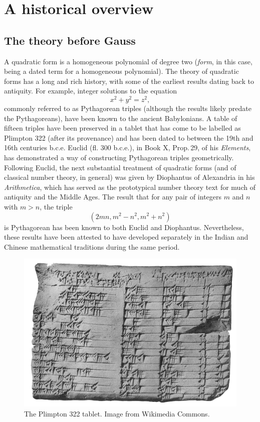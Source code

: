 
\chapter{A historical overview}
\label{chap:history}

\section{The theory before Gauss}

A quadratic form is a homogeneous polynomial of degree two (\emph{form}, in this
case, being a dated term for a homogeneous polynomial). The theory of quadratic
forms has a long and rich history, with some of the earliest results dating back
to antiquity. For example, integer solutions to the equation
\[
    x^2 + y^2 = z^2,
\]
commonly referred to as Pythagorean triples (although the results likely predate
the Pythagoreans), have been known to the ancient Babylonians. A table of
fifteen triples have been preserved in a tablet that has come to be labelled as
Plimpton 322 (after its provenance) and has been dated to between the 19th and
16th centuries {\sc b.c.e.} \cite{robson2002words} Euclid (fl.
300 {\sc b.c.e.}), in Book X, Prop.\,29, of his
\emph{Elements}, has demonstrated a way of constructing Pythagorean triples
geometrically.\,\cite{euclid1956elements} Following Euclid, the next substantial
treatment of quadratic forms (and of classical number theory, in general) was
given by Diophantus of Alexandria in his \emph{Arithmetica}, which has served as
the prototypical number theory text for much of antiquity and the Middle Ages.
\cite{katz2009history} The result that for any pair of integers \(m\) and \(n\)
with \(m > n\), the triple
\[
    (2mn, m^2 - n^2, m^2 + n^2)
\]
is Pythagorean has been known to both Euclid and Diophantus. Nevertheless, these
results have been attested to have developed separately in the Indian and
Chinese mathematical traditions during the same period. \cite{weil1984number}


\begin{figure}
    \centering
    \includegraphics[width=\textwidth]{assets/Plimpton_322.jpg}
    \caption[The Plimpton 322 tablet.]{The Plimpton 322 tablet. Image from Wikimedia Commons.}
    \label{fig:plimpton-322}
\end{figure}


